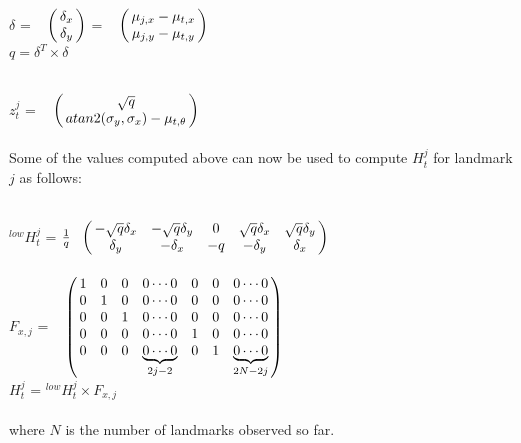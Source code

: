 \documentclass{ba-kecs}
\numberwithin{figure}{section}
\numberwithin{equation}{section}
\begin{document}
$\delta$ = $\bordermatrix{~ \cr
                        & \delta_{x} \cr
                        & \delta_{y}}$ = $\bordermatrix{~ \cr
                                                                                                & \mu_{j,x} - \mu_{t,x} \cr
                                                                & \mu_{j,y} - \mu_{t,y} \cr}$ \\

$q = \delta^{T} \times \delta$

$z^{j}_{t}$ = $\bordermatrix{~ \cr
                        & \sqrt{q} \cr
                        & atan2(\sigma_{y},\sigma_{x}) - \mu_{t,\theta}}$ \\ \\
Some of the values computed above can now be used to compute $H^{j}_{t}$ for landmark $j$ as follows:
                                                  
$^{low}H^{j}_{t}$ = $\frac{1}{q} \bordermatrix{~ \cr
                                & -\sqrt{q} \delta_{x} & -\sqrt{q} \delta_{y} & 0 & \sqrt{q} \delta_{x} & \sqrt{q} \delta_{y} \cr
                                & \delta_{y} & -\delta_{x} & -q & -\delta_{y} & \delta_{x}} $\\
                                
$F_{x,j}$ = $\bordermatrix{~ \cr
                        & 1 & 0 & 0 & 0 \cdots 0 & 0 & 0 & 0 \cdots 0 \cr
                        & 0 & 1 & 0 & 0 \cdots 0 & 0 & 0 & 0 \cdots 0 \cr
                        & 0 & 0 & 1 & 0 \cdots 0 & 0 & 0 & 0 \cdots 0 \cr
                        & 0 & 0 & 0 & 0 \cdots 0 & 1 & 0 & 0 \cdots 0 \cr
                        & 0 & 0 & 0 & \underbrace{0 \cdots 0}_{2j-2} & 0 & 1 & \underbrace{0 \cdots 0}_{2N-2j} \cr}$ \\
                                                  
$H^{j}_{t}$ = $^{low}H^{j}_{t} \times F_{x,j}$ \\ \\
where $N$ is the number of landmarks observed so far.
\end{document}
